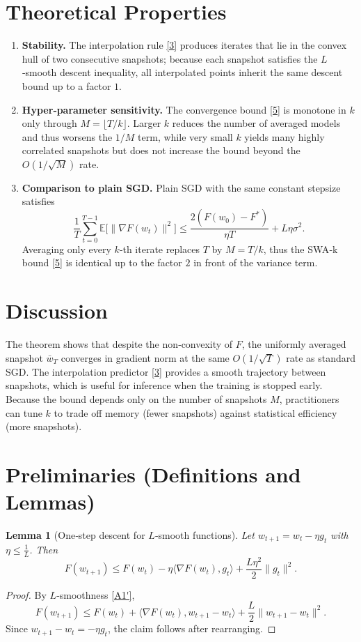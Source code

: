 \documentclass{article}
\newtheorem{lemma}{Lemma}
\begin{document}
\section*{Theoretical Properties}
\begin{enumerate}[label=\arabic*)]
\item \textbf{Stability.} The interpolation rule \eqref{3} produces iterates that lie in the convex hull of two consecutive snapshots; because each snapshot satisfies the $L$‑smooth descent inequality, all interpolated points inherit the same descent bound up to a factor $1$.
\item \textbf{Hyper‑parameter sensitivity.} The convergence bound \eqref{5} is monotone in $k$ only through $M=\lfloor T/k\rfloor$. Larger $k$ reduces the number of averaged models and thus worsens the $1/M$ term, while very small $k$ yields many highly correlated snapshots but does not increase the bound beyond the $O(1/\sqrt{M})$ rate.
\item \textbf{Comparison to plain SGD.} Plain SGD with the same constant stepsize satisfies
\[
\frac{1}{T}\sum_{t=0}^{T-1}\mathbb{E}\big[\|\nabla F(w_t)\|^{2}\big]
\le\frac{2(F(w_{0})-F^{*})}{\eta T}+L\eta\sigma^{2}.
\]
Averaging only every $k$‑th iterate replaces $T$ by $M=T/k$, thus the SWA‑k bound \eqref{5} is identical up to the factor $2$ in front of the variance term.
\end{enumerate}

\section*{Discussion}
The theorem shows that despite the non‑convexity of $F$, the uniformly averaged snapshot $\bar w_T$ converges in gradient norm at the same $O(1/\sqrt{T})$ rate as standard SGD.  
The interpolation predictor \eqref{3} provides a smooth trajectory between snapshots, which is useful for inference when the training is stopped early.  
Because the bound depends only on the number of snapshots $M$, practitioners can tune $k$ to trade off memory (fewer snapshots) against statistical efficiency (more snapshots).

\section*{Preliminaries (Definitions and Lemmas)}
\begin{lemma}[One‑step descent for $L$‑smooth functions]\label{lem:descent}
Let $w_{t+1}=w_t-\eta g_t$ with $\eta\le\frac{1}{L}$. Then
\[
F(w_{t+1})\le F(w_t)-\eta\langle\nabla F(w_t),g_t\rangle
+\frac{L\eta^{2}}{2}\|g_t\|^{2}.
\tag{L1}
\]
\end{lemma}
\begin{proof}
By $L$‑smoothness \eqref{A1'},
\[
F(w_{t+1})\le F(w_t)+\langle\nabla F(w_t),w_{t+1}-w_t\rangle
+\frac{L}{2}\|w_{t+1}-w_t\|^{2}.
\]
Since $w_{t+1}-w_t=-\eta g_t$, the claim follows after rearranging.
\end{proof}
\end{document}

